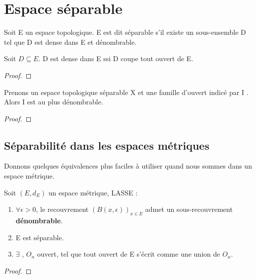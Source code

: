 \section{Espace séparable}

\begin{definition}
	Soit E un espace topologique.
	E est dit séparable s'il existe un sous-ensemble D tel que D est dense dans
	E et dénombrable.
\end{definition}

\begin{proposition}
	Soit $D \subseteq E$.
	D est dense dans E ssi D coupe tout ouvert de E.
\end{proposition}

\begin{proof}

\end{proof}

\begin{proposition}
	Prenons un espace topologique séparable X et une famille d'ouvert indicé par
	I . Alors I est au plus dénombrable.
\end{proposition}

\begin{proof}
	
\end{proof}

\subsection{Séparabilité dans les espaces métriques}

Donnons quelques équivalences plus faciles à utiliser quand nous sommes dans un
espace métrique.

\begin{proposition}
	Soit $(E, d_{E})$ un espace métrique, LASSE :
	\begin{enumerate}
		\item $\forall \epsilon > 0$, le recouvrement $(B(x, \epsilon))_{x \in
			E}$ admet un sous-recouvrement \textbf{dénombrable}.
		\item E est séparable.
		\item $\exists$ , $O_{n}$ ouvert, tel que
			tout ouvert de E s'écrit comme une union de $O_{n}$.
	\end{enumerate}
\end{proposition}

\begin{proof}
	
\end{proof}


